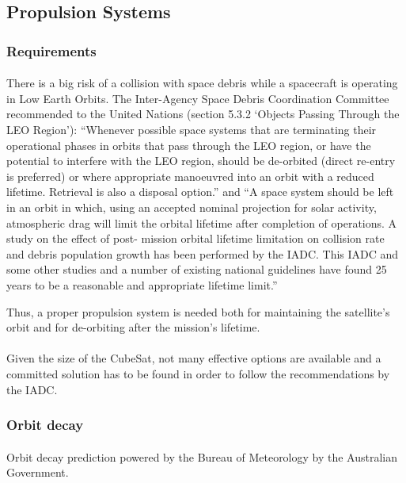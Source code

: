 \subsection{Propulsion Systems}

\subsubsection{Requirements}
\paragraph{}There is a big risk of a collision with space debris while a spacecraft is operating in Low Earth Orbits. The Inter-Agency Space Debris Coordination Committee recommended to the United Nations (section 5.3.2 ‘Objects Passing Through the LEO Region’): “Whenever possible space systems that are terminating their operational phases in orbits that pass through the LEO region, or have the potential to interfere with the LEO region, should be de-orbited (direct re-entry is preferred) or where appropriate manoeuvred into an orbit with a reduced lifetime. Retrieval is also a disposal option.” and “A space system should be left in an orbit in which, using an accepted nominal projection for solar activity, atmospheric drag will limit the orbital lifetime after completion of operations. A study on the effect of post- mission orbital lifetime limitation on collision rate and debris population growth has been performed by the IADC. This IADC and some other studies and a number of existing national guidelines have found 25 years to be a reasonable and appropriate lifetime limit.”

Thus, a proper propulsion system is needed both for maintaining the satellite's orbit and for de-orbiting after the mission's lifetime.

\paragraph{}Given the size of the CubeSat, not many effective options are available and a committed solution has to be found in order to follow the recommendations by the IADC.

\subsubsection{Orbit decay}

\paragraph{}Orbit decay prediction powered by the Bureau of Meteorology by the Australian Government.

